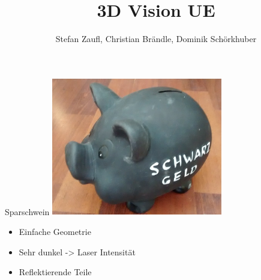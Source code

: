 \documentclass[11pt]{beamer}
\author{Stefan Zaufl, Christian Brändle, Dominik Schörkhuber}
\title{3D Vision UE}
\begin{document}
\begin{frame}
\titlepage
\end{frame}


\begin{frame}{Sparschwein}
\center
	\includegraphics[height=6cm]{images/sparschwein/photo.jpg}
	\begin{block}{}
		\begin{itemize}
			\item Einfache Geometrie
			\item Sehr dunkel -> Laser Intensität
			\item Reflektierende Teile
		\end{itemize}
	\end{block}

\end{frame}
\end{document}
